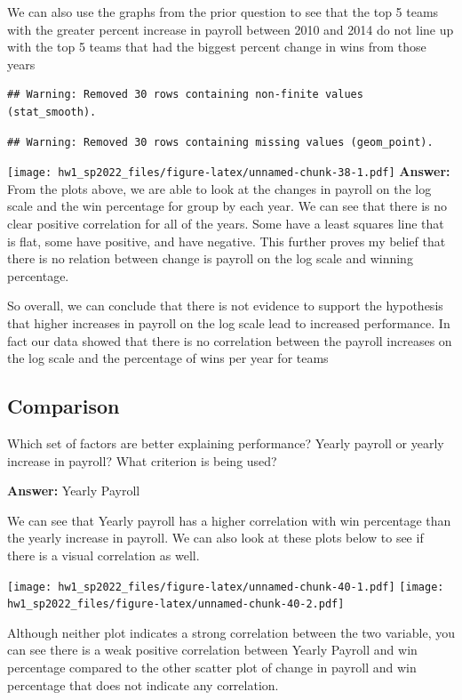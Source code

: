 \documentclass[
]{article}
\begin{document}
We can also use the graphs from the prior question to see that the top 5
teams with the greater percent increase in payroll between 2010 and 2014
do not line up with the top 5 teams that had the biggest percent change
in wins from those years

\begin{verbatim}
## Warning: Removed 30 rows containing non-finite values (stat_smooth).
\end{verbatim}

\begin{verbatim}
## Warning: Removed 30 rows containing missing values (geom_point).
\end{verbatim}

\texttt{[image: hw1\_sp2022\_files/figure-latex/unnamed-chunk-38-1.pdf]}
\textbf{Answer:} From the plots above, we are able to look at the
changes in payroll on the log scale and the win percentage for group by
each year. We can see that there is no clear positive correlation for
all of the years. Some have a least squares line that is flat, some have
positive, and have negative. This further proves my belief that there is
no relation between change is payroll on the log scale and winning
percentage.

So overall, we can conclude that there is not evidence to support the
hypothesis that higher increases in payroll on the log scale lead to
increased performance. In fact our data showed that there is no
correlation between the payroll increases on the log scale and the
percentage of wins per year for teams

\hypertarget{comparison}{%
\subsection{Comparison}\label{comparison}}

Which set of factors are better explaining performance? Yearly payroll
or yearly increase in payroll? What criterion is being used?

\textbf{Answer:} Yearly Payroll

We can see that Yearly payroll has a higher correlation with win
percentage than the yearly increase in payroll. We can also look at
these plots below to see if there is a visual correlation as well.

\texttt{[image: hw1\_sp2022\_files/figure-latex/unnamed-chunk-40-1.pdf]}
\texttt{[image: hw1\_sp2022\_files/figure-latex/unnamed-chunk-40-2.pdf]}

Although neither plot indicates a strong correlation between the two
variable, you can see there is a weak positive correlation between
Yearly Payroll and win percentage compared to the other scatter plot of
change in payroll and win percentage that does not indicate any
correlation.
\end{document}
